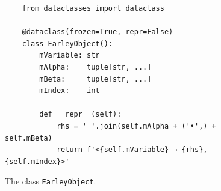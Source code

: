 \begin{figure}[!ht]
\centering
\begin{verbatim}
    from dataclasses import dataclass

    @dataclass(frozen=True, repr=False)
    class EarleyObject():
        mVariable: str
        mAlpha:    tuple[str, ...]
        mBeta:     tuple[str, ...]
        mIndex:    int

        def __repr__(self):
            rhs = ' '.join(self.mAlpha + ('•',) + self.mBeta)
            return f'<{self.mVariable} → {rhs}, {self.mIndex}>'
\end{verbatim}
\vspace*{-0.3cm}
\caption{The class \texttt{EarleyObject}.}
\label{fig:01-Earley-Parser.ipynb:EarleyObject}
\end{figure}

